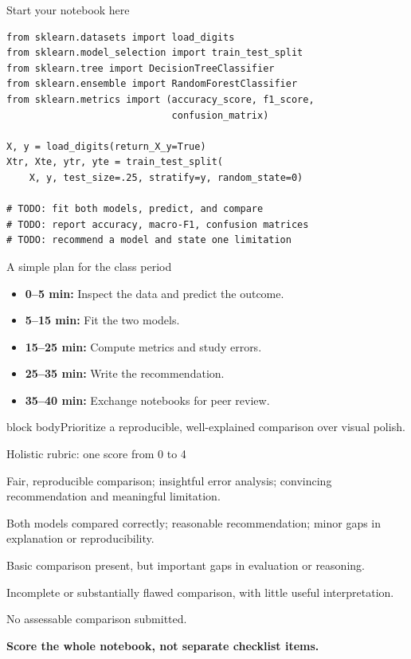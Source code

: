 \documentclass[aspectratio=43,11pt]{beamer}
\newcommand{\takeaway}[1]{\medskip\begin{beamercolorbox}[wd=\linewidth,sep=8pt,rounded=false]{block body}#1\end{beamercolorbox}}
\begin{document}
\begin{frame}[fragile]{Start your notebook here}
\begin{lstlisting}
from sklearn.datasets import load_digits
from sklearn.model_selection import train_test_split
from sklearn.tree import DecisionTreeClassifier
from sklearn.ensemble import RandomForestClassifier
from sklearn.metrics import (accuracy_score, f1_score,
                             confusion_matrix)

X, y = load_digits(return_X_y=True)
Xtr, Xte, ytr, yte = train_test_split(
    X, y, test_size=.25, stratify=y, random_state=0)

# TODO: fit both models, predict, and compare
# TODO: report accuracy, macro-F1, confusion matrices
# TODO: recommend a model and state one limitation
\end{lstlisting}
\end{frame}

\begin{frame}{A simple plan for the class period}
\begin{itemize}
\item \textbf{0--5 min:} Inspect the data and predict the outcome.
\item \textbf{5--15 min:} Fit the two models.
\item \textbf{15--25 min:} Compute metrics and study errors.
\item \textbf{25--35 min:} Write the recommendation.
\item \textbf{35--40 min:} Exchange notebooks for peer review.
\end{itemize}
\takeaway{Prioritize a reproducible, well-explained comparison over visual polish.}
\end{frame}

\begin{frame}{Holistic rubric: one score from 0 to 4}
\small
\begin{description}
\setlength\itemsep{0.7em}
\item[4 --- Excellent] Fair, reproducible comparison; insightful error analysis; convincing recommendation and meaningful limitation.
\item[3 --- Proficient] Both models compared correctly; reasonable recommendation; minor gaps in explanation or reproducibility.
\item[2 --- Developing] Basic comparison present, but important gaps in evaluation or reasoning.
\item[1 --- Beginning] Incomplete or substantially flawed comparison, with little useful interpretation.
\item[0 --- No evidence] No assessable comparison submitted.
\end{description}
\vfill
\normalsize\textbf{Score the whole notebook, not separate checklist items.}
\end{frame}
\end{document}
